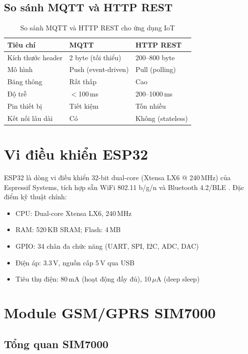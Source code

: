 \documentclass[13pt, a4paper]{report}
\begin{document}
\subsection{So sánh MQTT và HTTP REST}

\begin{table}[H]
\centering
\caption{So sánh MQTT và HTTP REST cho ứng dụng IoT}
\label{tab:mqtt_vs_http}
\begin{tabularx}{\textwidth}{l X X}
\toprule
\textbf{Tiêu chí} & \textbf{MQTT} & \textbf{HTTP REST} \\
\midrule
Kích thước header & 2 byte (tối thiểu) & 200--800 byte \\
Mô hình & Push (event-driven) & Pull (polling) \\
Băng thông & Rất thấp & Cao \\
Độ trễ & $<$100\,ms & 200--1000\,ms \\
Pin thiết bị & Tiết kiệm & Tốn nhiều \\
Kết nối lâu dài & Có & Không (stateless) \\
\bottomrule
\end{tabularx}
\end{table}

\section{Vi điều khiển ESP32}

ESP32 là dòng vi điều khiển 32-bit dual-core (Xtensa LX6 @ 240\,MHz) của Espressif Systems, tích hợp sẵn WiFi 802.11 b/g/n và Bluetooth 4.2/BLE \cite{espressif2023esp32}. Đặc điểm kỹ thuật chính:

\begin{itemize}[noitemsep]
  \item CPU: Dual-core Xtensa LX6, 240\,MHz
  \item RAM: 520\,KB SRAM; Flash: 4\,MB
  \item GPIO: 34 chân đa chức năng (UART, SPI, I2C, ADC, DAC)
  \item Điện áp: 3.3\,V, nguồn cấp 5\,V qua USB
  \item Tiêu thụ điện: 80\,mA (hoạt động đầy đủ), 10\,$\mu$A (deep sleep)
\end{itemize}

\section{Module GSM/GPRS SIM7000}

\subsection{Tổng quan SIM7000}
\end{document}
